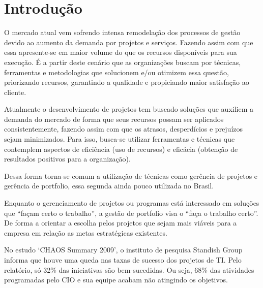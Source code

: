 \documentclass[12pt,a4paper,ruledheader,tocpage=prefix,floatnumber=continuous,pagestart=folhaderosto,font=times]{abnt}
\begin{document}
















\listadefiguras
\cleardoublepage 
\listadetabelas
\cleardoublepage



\tableofcontents

\chapter{Introdução}
O mercado atual vem sofrendo intensa remodelação dos processos de gestão devido ao aumento da demanda por projetos e serviços. Fazendo assim com que essa 
apresente-se em maior volume do que os recursos disponíveis para sua execução. É a partir deste cenário que as organizações buscam por técnicas, ferramentas 
e metodologias que solucionem e/ou otimizem essa questão, priorizando recursos, garantindo a qualidade e propiciando maior satisfação ao cliente. 

Atualmente o desenvolvimento de projetos tem buscado soluções que auxiliem a demanda do mercado de forma que seus recursos possam ser aplicados
consistentemente, fazendo assim com que os atrasos, desperdícios e prejuízos sejam minimizados. Para isso, busca-se utilizar ferramentas e 
técnicas que contemplem aspectos de eficiência (uso de recursos) e eficácia (obtenção de resultados positivos para a organização).

Dessa forma torna-se comum a utilização de técnicas como gerência de projetos e gerência de portfolio, essa segunda ainda pouco utilizada no Brasil.

Enquanto o gerenciamento de projetos ou programas está interessado em soluções que ``façam certo o trabalho'', a gestão de portfolio visa o ``faça o 
trabalho certo''\cite{SPPM2008}. De forma a orientar a escolha pelos projetos que sejam mais viáveis para a empresa em relação as metas estratégicas 
existentes. 

No estudo ‘CHAOS Summary 2009’, o instituto de pesquisa Standish Group informa que houve uma queda nas taxas de sucesso dos projetos de TI. Pelo 
relatório, só 32\% das iniciativas são bem-sucedidas. Ou seja, 68\% das atividades programadas pelo CIO e sua equipe acabam não atingindo os objetivos.
\end{document}
